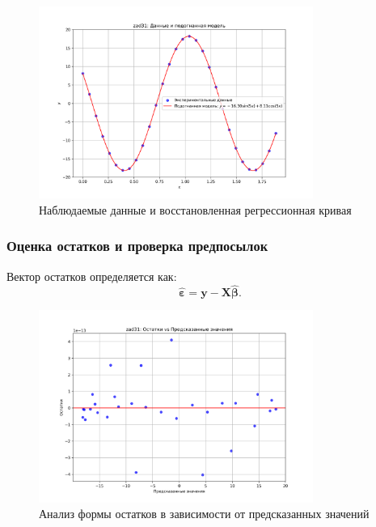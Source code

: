 \begin{figure}[H]
\centering
\includegraphics[width=0.8\textwidth]{fig/zad31_data_fit.png}
\caption{Наблюдаемые данные и восстановленная регрессионная кривая}
\label{fig:zad31_data_fit}
\end{figure}

\subsubsection{Оценка остатков и проверка предпосылок}

Вектор остатков определяется как:
\begin{equation}
    \hat{\boldsymbol{\varepsilon}} = \mathbf{y} - \mathbf{X} \hat{\boldsymbol{\beta}}.
\end{equation}

\begin{figure}[H]
\centering
\includegraphics[width=0.8\textwidth]{fig/zad31_residuals_vs_predicted.png}
\caption{Анализ формы остатков в зависимости от предсказанных значений}
\label{fig:zad31_residuals_vs_predicted}
\end{figure}

